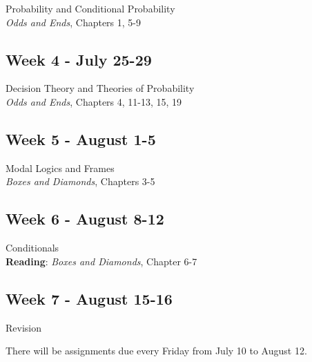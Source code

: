 \documentclass[10pt]{article}
\begin{document}
Probability and Conditional Probability\\
\textit{Odds and Ends}, Chapters 1, 5-9
 
\subsection*{Week 4 - July 25-29}

Decision Theory and Theories of Probability\\
\textit{Odds and Ends}, Chapters 4, 11-13, 15, 19

\subsection*{Week 5 - August 1-5}

Modal Logics and Frames \\
\textit{Boxes and Diamonds}, Chapters 3-5

\subsection*{Week 6 - August 8-12}

Conditionals \\
\textbf{Reading}: \textit{Boxes and Diamonds}, Chapter 6-7

\subsection*{Week 7 - August 15-16}

Revision

\bigskip

There will be assignments due every Friday from July 10 to August 12.
\end{document}
